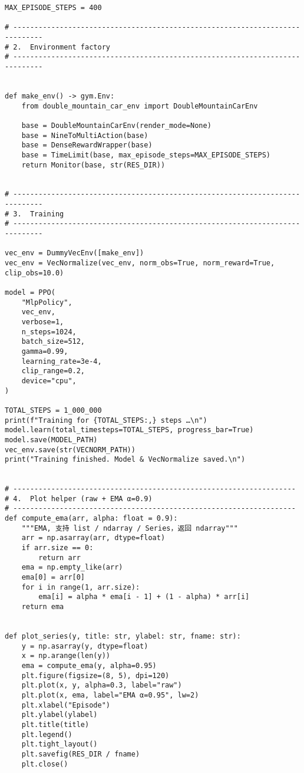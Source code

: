 \begin{verbatim}
MAX_EPISODE_STEPS = 400

# -----------------------------------------------------------------------------
# 2.  Environment factory
# -----------------------------------------------------------------------------


def make_env() -> gym.Env:
    from double_mountain_car_env import DoubleMountainCarEnv

    base = DoubleMountainCarEnv(render_mode=None)
    base = NineToMultiAction(base)
    base = DenseRewardWrapper(base)
    base = TimeLimit(base, max_episode_steps=MAX_EPISODE_STEPS)
    return Monitor(base, str(RES_DIR))


# -----------------------------------------------------------------------------
# 3.  Training
# -----------------------------------------------------------------------------

vec_env = DummyVecEnv([make_env])
vec_env = VecNormalize(vec_env, norm_obs=True, norm_reward=True, clip_obs=10.0)

model = PPO(
    "MlpPolicy",
    vec_env,
    verbose=1,
    n_steps=1024,
    batch_size=512,
    gamma=0.99,
    learning_rate=3e-4,
    clip_range=0.2,
    device="cpu",
)

TOTAL_STEPS = 1_000_000
print(f"Training for {TOTAL_STEPS:,} steps …\n")
model.learn(total_timesteps=TOTAL_STEPS, progress_bar=True)
model.save(MODEL_PATH)
vec_env.save(str(VECNORM_PATH))
print("Training finished. Model & VecNormalize saved.\n")


# -------------------------------------------------------------------
# 4.  Plot helper (raw + EMA α=0.9)
# -------------------------------------------------------------------
def compute_ema(arr, alpha: float = 0.9):
    """EMA, 支持 list / ndarray / Series，返回 ndarray"""
    arr = np.asarray(arr, dtype=float)
    if arr.size == 0:
        return arr
    ema = np.empty_like(arr)
    ema[0] = arr[0]
    for i in range(1, arr.size):
        ema[i] = alpha * ema[i - 1] + (1 - alpha) * arr[i]
    return ema


def plot_series(y, title: str, ylabel: str, fname: str):
    y = np.asarray(y, dtype=float)
    x = np.arange(len(y))
    ema = compute_ema(y, alpha=0.95)
    plt.figure(figsize=(8, 5), dpi=120)
    plt.plot(x, y, alpha=0.3, label="raw")
    plt.plot(x, ema, label="EMA α=0.95", lw=2)
    plt.xlabel("Episode")
    plt.ylabel(ylabel)
    plt.title(title)
    plt.legend()
    plt.tight_layout()
    plt.savefig(RES_DIR / fname)
    plt.close()



\end{verbatim}
